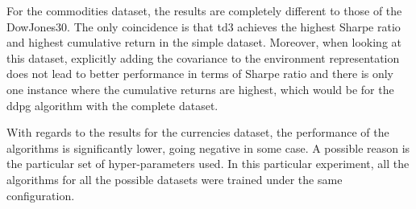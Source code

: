 For the commodities dataset, the results are completely different to those of the DowJones30. The only coincidence is that \acrshort{td3} achieves the highest Sharpe ratio and highest cumulative return in the simple dataset. Moreover, when looking at this dataset, explicitly adding the covariance to the environment representation does not lead to better performance in terms of Sharpe ratio and there is only one instance where the cumulative returns are highest, which would be for the \acrshort{ddpg} algorithm with the complete dataset.

With regards to the results for the currencies dataset, the performance of the algorithms is significantly lower, going negative in some case. A possible reason is the particular set of hyper-parameters used. In this particular experiment, all the algorithms for all the possible datasets were trained under the same configuration. 

